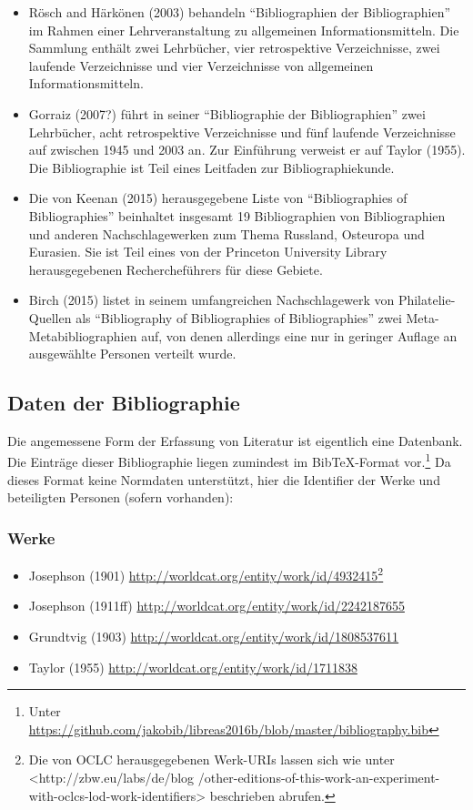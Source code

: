 \documentclass[a4paper,
fontsize=11pt,
oneside,
numbers=noperiodatend,
parskip=half-,
bibliography=totoc,
final
]{scrartcl}
\providecommand{\tightlist}{%
  \setlength{\itemsep}{0pt}\setlength{\parskip}{0pt}}
\begin{document}
\begin{itemize}
\item
  Rösch and Härkönen (2003) behandeln \enquote{Bibliographien der
  Bibliographien} im Rahmen einer Lehrveranstaltung zu allgemeinen
  Informationsmitteln. Die Sammlung enthält zwei Lehrbücher, vier
  retrospektive Verzeichnisse, zwei laufende Verzeichnisse und vier
  Verzeichnisse von allgemeinen Informationsmitteln.
\item
  Gorraiz (2007?) führt in seiner \enquote{Bibliographie der
  Bibliographien} zwei Lehrbücher, acht retrospektive Verzeichnisse und
  fünf laufende Verzeichnisse auf zwischen 1945 und 2003 an. Zur
  Einführung verweist er auf Taylor (1955). Die Bibliographie ist Teil
  eines Leitfaden zur Bibliographiekunde.
\item
  Die von Keenan (2015) herausgegebene Liste von \enquote{Bibliographies
  of Bibliographies} beinhaltet insgesamt 19 Bibliographien von
  Bibliographien und anderen Nachschlagewerken zum Thema Russland,
  Osteuropa und Eurasien. Sie ist Teil eines von der Princeton
  University Library herausgegebenen Rechercheführers für diese Gebiete.
\item
  Birch (2015) listet in seinem umfangreichen Nachschlagewerk von
  Philatelie- Quellen als \enquote{Bibliography of Bibliographies of
  Bibliographies} zwei Meta- Metabibliographien auf, von denen
  allerdings eine nur in geringer Auflage an ausgewählte Personen
  verteilt wurde.
\end{itemize}

\subsection*{Daten der Bibliographie}\label{daten-der-bibliographie}

Die angemessene Form der Erfassung von Literatur ist eigentlich eine
Datenbank. Die Einträge dieser Bibliographie liegen zumindest im
BibTeX-Format vor.\footnote{Unter
  \url{https://github.com/jakobib/libreas2016b/blob/master/bibliography.bib}}
Da dieses Format keine Normdaten unterstützt, hier die Identifier der
Werke und beteiligten Personen (sofern vorhanden):

\subsubsection*{Werke}\label{werke}

\begin{itemize}
\tightlist
\item
  Josephson (1901)
  \url{http://worldcat.org/entity/work/id/4932415}\footnote{Die von OCLC
    herausgegebenen Werk-URIs lassen sich wie unter
    \textless{}http://zbw.eu/labs/de/blog
    /other-editions-of-this-work-an-experiment-with-oclcs-lod-work-identifiers\textgreater{}
    beschrieben abrufen.}
\item
  Josephson (1911ff) \url{http://worldcat.org/entity/work/id/2242187655}
\item
  Grundtvig (1903) \url{http://worldcat.org/entity/work/id/1808537611}
\item
  Taylor (1955) \url{http://worldcat.org/entity/work/id/1711838}
\end{itemize}
\end{document}
